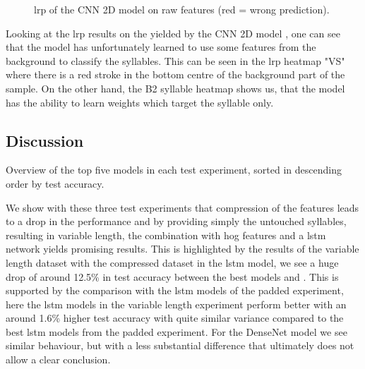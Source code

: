 \begin{figure}[ht!]
\centering
  \hfill
  \caption{\Gls{lrp} of the CNN 2D model \cite{nn_cnn_2d_sct_left_padded_nrs6xpps5000h512_raw_100} on raw features (red = wrong prediction).}
  \label{fig:lrp_cnn_2d_sct_left_padded_nrs6xpps5000h512_raw_100}
\end{figure}

Looking at the \gls{lrp} results on the  yielded by the CNN 2D model \cite{nn_cnn_2d_sct_left_padded_nrs6xpps5000h512_raw_100}, one can see that the model has unfortunately learned to use some features from the background to classify the syllables. This can be seen in the \gls{lrp} heatmap "VS" where there is a red stroke in the bottom centre of the background part of the sample. On the other hand, the B2 syllable heatmap shows us, that the model has the ability to learn weights which target the syllable only.

\subsection{Discussion}\label{sec:test_discussion}
\begin{table}[ht!]
\centering

\caption{Overview of the top five models in each test experiment, sorted in descending order by test accuracy.}
\label{tab:result_overview_sct}
\end{table}
We show with these three test experiments that compression of the features leads to a drop in the performance and by providing simply the untouched syllables, resulting in variable length, the combination with \gls{hog} features and a \gls{lstm} network yields promising results.
This is highlighted by the results of the variable length dataset with the compressed dataset in the \gls{lstm} model, we see a huge drop of around 12.5\% in test accuracy between the best models \cite{nn_lstm_sct_vl_xpps4000_h300_hog_100} and \cite{nn_lstm_sct_compressed_nrs0_hog_100}.
This is supported by the comparison with the \gls{lstm} models of the padded experiment, here the \gls{lstm} models in the variable length experiment perform better with an around 1.6\% higher test accuracy with quite similar variance compared to the best \gls{lstm} models from the padded experiment.
For the DenseNet model we see similar behaviour, but with a less substantial difference that ultimately does not allow a clear conclusion.

